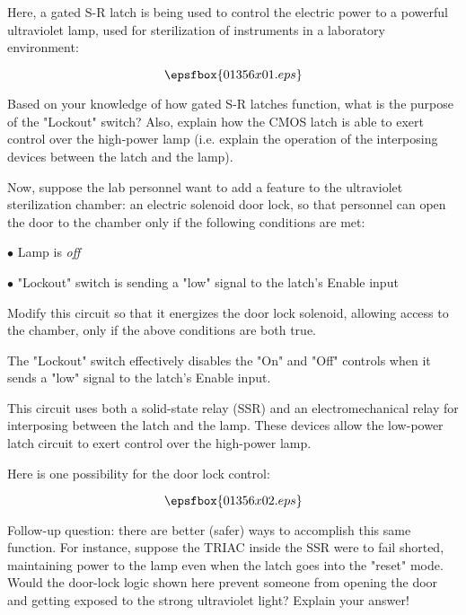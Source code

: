 

Here, a gated S-R latch is being used to control the electric power to a powerful ultraviolet lamp, used for sterilization of instruments in a laboratory environment:

$$\epsfbox{01356x01.eps}$$

Based on your knowledge of how gated S-R latches function, what is the purpose of the "Lockout" switch?  Also, explain how the CMOS latch is able to exert control over the high-power lamp (i.e. explain the operation of the interposing devices between the latch and the lamp).

\vskip 10pt

Now, suppose the lab personnel want to add a feature to the ultraviolet sterilization chamber: an electric solenoid door lock, so that personnel can open the door to the chamber only if the following conditions are met:

\medskip
\item{$\bullet$} Lamp is {\it off}
\item{$\bullet$} "Lockout" switch is sending a "low" signal to the latch's Enable input
\medskip

Modify this circuit so that it energizes the door lock solenoid, allowing access to the chamber, only if the above conditions are both true.







The "Lockout" switch effectively disables the "On" and "Off" controls when it sends a "low" signal to the latch's Enable input.

This circuit uses both a solid-state relay (SSR) and an electromechanical relay for interposing between the latch and the lamp.  These devices allow the low-power latch circuit to exert control over the high-power lamp.

\vskip 10pt

Here is one possibility for the door lock control:

$$\epsfbox{01356x02.eps}$$

\vskip 10pt

Follow-up question: there are better (safer) ways to accomplish this same function.  For instance, suppose the TRIAC inside the SSR were to fail shorted, maintaining power to the lamp even when the latch goes into the "reset" mode.  Would the door-lock logic shown here prevent someone from opening the door and getting exposed to the strong ultraviolet light?  Explain your answer!

